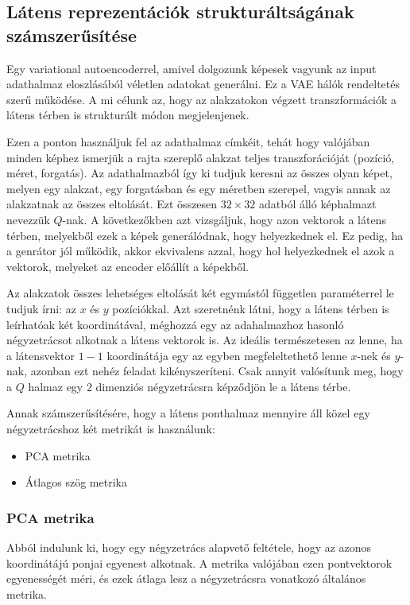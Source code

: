 \documentclass[12pt]{article}
\begin{document}
\subsection{Látens reprezentációk strukturáltságának számszerűsítése}

Egy variational autoencoderrel, amivel dolgozunk képesek vagyunk az input adathalmaz eloszlásából véletlen adatokat generálni. Ez a VAE hálók rendeltetés szerű működése. A mi célunk az, hogy az alakzatokon végzett transzformációk a látens térben is strukturált módon megjelenjenek.

Ezen a ponton használjuk fel az adathalmaz címkéit, tehát hogy valójában minden képhez ismerjük a rajta szereplő alakzat teljes transzforációját (pozíció, méret, forgatás). Az adathalmazból így ki tudjuk keresni az összes olyan képet, melyen egy alakzat, egy forgatásban és egy méretben szerepel, vagyis annak az alakzatnak az összes eltolását. Ezt összesen $32\times32$ adatból álló képhalmazt nevezzük $Q$-nak. A következőkben azt vizsgáljuk, hogy azon vektorok a látens térben, melyekből ezek a képek generálódnak, hogy helyezkednek el. Ez pedig, ha a genrátor jól működik, akkor ekvivalens azzal, hogy hol helyezkednek el azok a vektorok, melyeket az encoder előállít a képekből.

Az alakzatok összes lehetséges eltolását két egymástól független paraméterrel le tudjuk írni: az $x$ és $y$ pozíciókkal. Azt szeretnénk látni, hogy a látens térben is leírhatóak két koordinátával, méghozzá egy az adahalmazhoz hasonló négyzetrácsot alkotnak a látens vektorok is. Az ideális természetesen az lenne, ha a látensvektor $1-1$ koordinátája egy az egyben megfeleltethető lenne $x$-nek és $y$-nak, azonban ezt nehéz feladat kikényszeríteni. Csak annyit valósítunk meg, hogy a $Q$ halmaz egy 2 dimenziós négyzetrácsra képződjön le a látens térbe. 

Annak számszerűsítésére, hogy a látens ponthalmaz mennyire áll közel egy négyzetrácshoz két metrikát is használunk:
\begin{itemize}
  \item PCA metrika
  \item Átlagos szög metrika
\end{itemize}

\subsubsection{PCA metrika}

Abból indulunk ki, hogy egy négyzetrács alapvető feltétele, hogy az azonos koordinátájú ponjai egyenest alkotnak. A metrika valójában ezen pontvektorok egyenességét méri, és ezek átlaga lesz a négyzetrácsra vonatkozó általános metrika.
\end{document}
